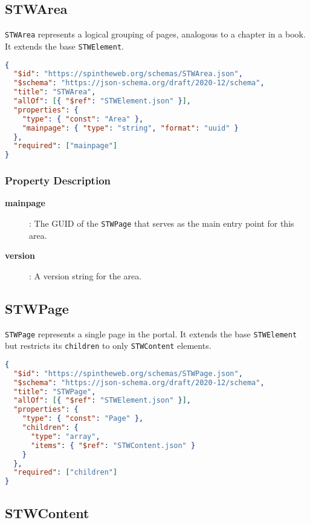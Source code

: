 \subsection{STWArea}

	\texttt{STWArea} represents a logical grouping of pages, analogous to a chapter in a book. It extends the base \texttt{STWElement}.

\begin{lstlisting}[language=JSON,caption={STWArea Schema Definition}]
{
  "$id": "https://spintheweb.org/schemas/STWArea.json",
  "$schema": "https://json-schema.org/draft/2020-12/schema",
  "title": "STWArea",
  "allOf": [{ "$ref": "STWElement.json" }],
  "properties": {
    "type": { "const": "Area" },
    "mainpage": { "type": "string", "format": "uuid" }
  },
  "required": ["mainpage"]
}
\end{lstlisting}

\subsubsection{Property Description}

\begin{description}
\item[\textbf{mainpage}]: The GUID of the \texttt{STWPage} that serves as the main entry point for this area.
\item[\textbf{version}]: A version string for the area.
\end{description}

\subsection{STWPage}

	\texttt{STWPage} represents a single page in the portal. It extends the base \texttt{STWElement} but restricts its \texttt{children} to only \texttt{STWContent} elements.

\begin{lstlisting}[language=JSON,caption={STWPage Schema Definition}]
{
  "$id": "https://spintheweb.org/schemas/STWPage.json",
  "$schema": "https://json-schema.org/draft/2020-12/schema",
  "title": "STWPage",
  "allOf": [{ "$ref": "STWElement.json" }],
  "properties": {
    "type": { "const": "Page" },
    "children": {
      "type": "array",
      "items": { "$ref": "STWContent.json" }
    }
  },
  "required": ["children"]
}
\end{lstlisting}

\subsection{STWContent}

